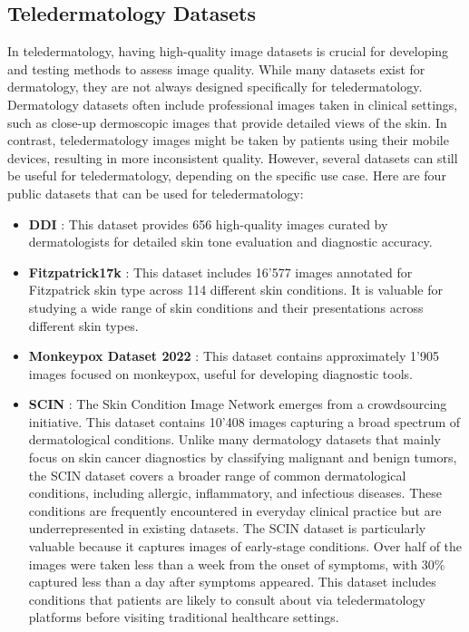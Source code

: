 \subsection{Teledermatology Datasets}
\label{sub:DatasetsTD}
In teledermatology, having high-quality image datasets is crucial for developing and testing methods to assess image quality. While many datasets exist for dermatology, they are not always designed specifically for teledermatology. Dermatology datasets often include professional images taken in clinical settings, such as close-up dermoscopic images that provide detailed views of the skin. In contrast, teledermatology images might be taken by patients using their mobile devices, resulting in more inconsistent quality. However, several datasets can still be useful for teledermatology, depending on the specific use case. Here are four public datasets that can be used for teledermatology: \par
\begin{itemize}
    \item \textbf{DDI} \autocite{DDI}: This dataset provides 656 high-quality images curated by dermatologists for detailed skin tone evaluation and diagnostic accuracy.
    \item \textbf{Fitzpatrick17k} \autocite{F17K}: This dataset includes 16'577 images annotated for Fitzpatrick skin type \autocite{Fitzpatrick} across 114 different skin conditions. It is valuable for studying a wide range of skin conditions and their presentations across different skin types.
    \item \textbf{Monkeypox Dataset 2022} \autocite{Monkeypox}: This dataset contains approximately 1'905 images focused on monkeypox, useful for developing diagnostic tools.
    \item \textbf{SCIN} \autocite{SCIN}: The Skin Condition Image Network emerges from a crowdsourcing initiative. This dataset contains 10'408 images capturing a broad spectrum of dermatological conditions. Unlike many dermatology datasets that mainly focus on skin cancer diagnostics by classifying malignant and benign tumors, the SCIN dataset covers a broader range of common dermatological conditions, including allergic, inflammatory, and infectious diseases. These conditions are frequently encountered in everyday clinical practice but are underrepresented in existing datasets. The SCIN dataset is particularly valuable because it captures images of early-stage conditions. Over half of the images were taken less than a week from the onset of symptoms, with 30\% captured less than a day after symptoms appeared. This dataset includes conditions that patients are likely to consult about via teledermatology platforms before visiting traditional healthcare settings.
\end{itemize}

